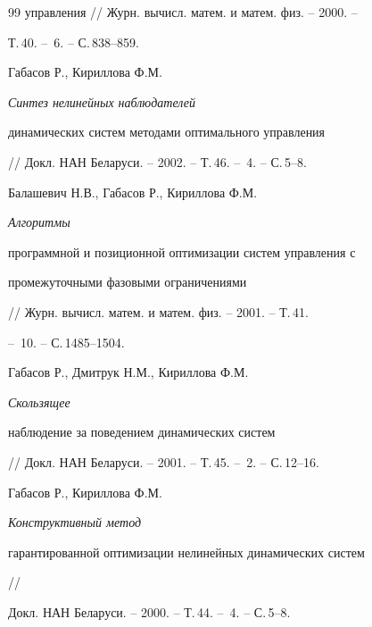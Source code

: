 \begin{thebibliography}{99}
{управления} // Журн. вычисл. матем. и матем. физ. -- 2000. -- 


Т.\,40. -- \No\,6. -- С.\,838--859.




Габасов Р., Кириллова Ф.М. {\it Синтез нелинейных наблюдателей


динамических систем методами оптимального управления}


// Докл. НАН Беларуси. -- 2002. -- Т.\,46. -- \No\,4. -- С.\,5--8.




Балашевич Н.В., Габасов Р., Кириллова Ф.М. {\it Алгоритмы


программной и позиционной оптимизации систем управления с


промежуточными фазовыми ограничениями}


// Журн. вычисл. матем. и матем. физ. -- 2001. -- Т.\,41.


-- \No\,10. -- С.\,1485--1504.




Габасов Р., Дмитрук Н.М., Кириллова Ф.М. {\it Скользящее


наблюдение за поведением динамических систем}


// Докл. НАН Беларуси. -- 2001. -- Т.\,45. -- \No\,2. -- С.\,12--16.




Габасов Р., Кириллова Ф.М. {\it Конструктивный метод


гарантированной оптимизации нелинейных динамических систем} //


Докл. НАН Беларуси. -- 2000. -- Т.\,44. -- \No\,4. -- С.\,5--8.





\end{thebibliography}





\vskip 2cm














\label{end}









